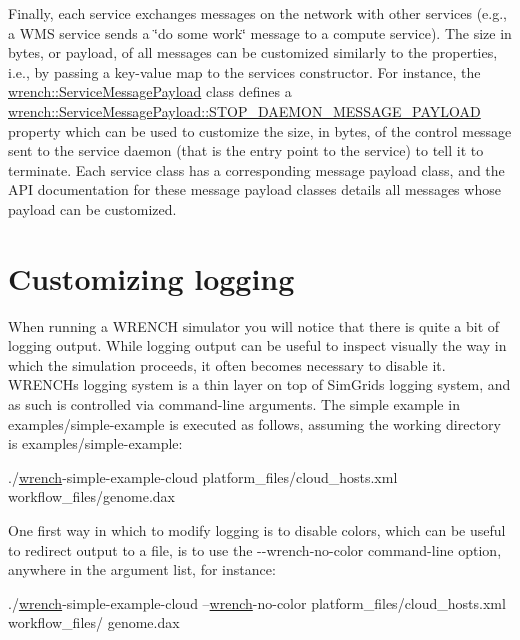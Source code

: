 Finally, each service exchanges messages on the network with other services (e.\+g., a W\+MS service sends a \char`\"{}do some work\char`\"{} message to a compute service). The size in bytes, or payload, of all messages can be customized similarly to the properties, i.\+e., by passing a key-\/value map to the service\textquotesingle{}s constructor. For instance, the {\ttfamily \hyperlink{classwrench_1_1_service_message_payload}{wrench\+::\+Service\+Message\+Payload}} class defines a {\ttfamily \hyperlink{classwrench_1_1_service_message_payload_a9efb4a6b2c8876e17a3f636ba5ac17f6}{wrench\+::\+Service\+Message\+Payload\+::\+S\+T\+O\+P\+\_\+\+D\+A\+E\+M\+O\+N\+\_\+\+M\+E\+S\+S\+A\+G\+E\+\_\+\+P\+A\+Y\+L\+O\+AD}} property which can be used to customize the size, in bytes, of the control message sent to the service daemon (that is the entry point to the service) to tell it to terminate. Each service class has a corresponding message payload class, and the A\+PI documentation for these message payload classes details all messages whose payload can be customized.\hypertarget{wrench-101_wrench-101-logging}{}\section{Customizing logging}\label{wrench-101_wrench-101-logging}
When running a W\+R\+E\+N\+CH simulator you will notice that there is quite a bit of logging output. While logging output can be useful to inspect visually the way in which the simulation proceeds, it often becomes necessary to disable it. W\+R\+E\+N\+CH\textquotesingle{}s logging system is a thin layer on top of Sim\+Grid\textquotesingle{}s logging system, and as such is controlled via command-\/line arguments. The simple example in {\ttfamily examples/simple-\/example} is executed as follows, assuming the working directory is {\ttfamily examples/simple-\/example}\+:


\begin{DoxyCode}
./\hyperlink{namespacewrench}{wrench}-simple-example-cloud  platform\_files/cloud\_hosts.xml workflow\_files/genome.dax
\end{DoxyCode}


One first way in which to modify logging is to disable colors, which can be useful to redirect output to a file, is to use the {\ttfamily -\/-\/wrench-\/no-\/color} command-\/line option, anywhere in the argument list, for instance\+:


\begin{DoxyCode}
./\hyperlink{namespacewrench}{wrench}-simple-example-cloud  --\hyperlink{namespacewrench}{wrench}-no-color platform\_files/cloud\_hosts.xml workflow\_files/
      genome.dax
\end{DoxyCode}


